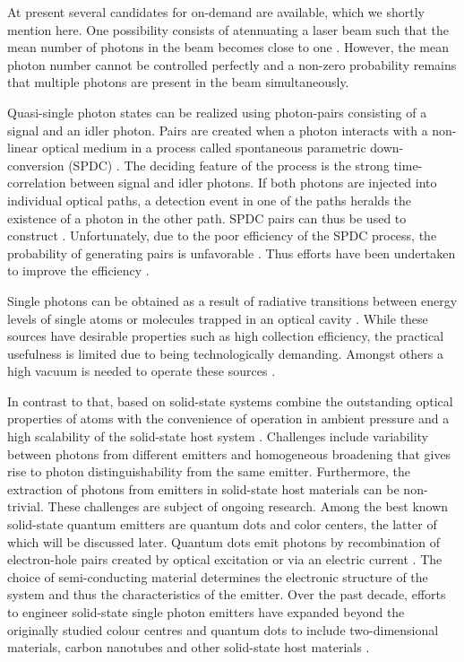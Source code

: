 	At present several candidates for on-demand \spss are available, which we shortly mention here. One possibility consists of atennuating a laser beam such that the mean number of photons in the beam becomes close to one \cite{gisin2002quantum, eisaman2011invited, migdall2013single}. However, the mean photon number cannot be controlled perfectly and a non-zero probability remains that multiple photons are present in the beam simultaneously.

	Quasi-single photon states can be realized using photon-pairs consisting of a signal and an idler photon. Pairs are created when a photon interacts with a non-linear optical medium in a process called spontaneous parametric down-conversion (SPDC) \cite{shih2003entangled, klyshko1977utilization, fasel2004high, ware2004single, brida2012extremely,SiquteProject}. The deciding feature of the process is the strong time-correlation between signal and idler photons. If both photons are injected into individual optical paths, a detection event in one of the paths heralds the existence of a photon in the other path. SPDC pairs can thus be used to construct \spss. Unfortunately, due to the poor efficiency of the SPDC process, the probability of generating pairs is unfavorable \cite{zwinkels2010photometry, Bock2016}. Thus efforts have been undertaken to improve the efficiency \cite{Bock2016, vrehavcek2003multiple, brida2008experimental}.

	Single photons can be obtained as a result of radiative transitions between energy levels of single atoms or molecules trapped in an optical cavity \cite{Kuhn2002}. While these sources have desirable properties such as high collection efficiency, the practical usefulness is limited due to being technologically demanding. Amongst others a high vacuum is needed to operate these sources \cite{zwinkels2010photometry}.

	In contrast to that, \spss based on solid-state systems combine the outstanding optical properties of atoms with the convenience of operation in ambient pressure and a high scalability of the solid-state host system \cite{loredo2016scalable,somaschi2016near,Aharonovich2016}.
	Challenges include variability between photons from different emitters and homogeneous \lw broadening that gives rise to photon distinguishability from the same emitter. 
	Furthermore, the extraction of photons from emitters in solid-state host materials can be non-trivial.
	These challenges are subject of ongoing research.
	Among the best known solid-state quantum emitters are quantum dots and color centers, the latter of which will be discussed later.
	Quantum dots emit photons by recombination of electron-hole pairs created by optical excitation or via an electric current \cite{Yuan2002, buckley2012engineered}. The choice of semi-conducting material determines the electronic structure of the system and thus the characteristics of the emitter.
	Over the past decade, efforts to engineer solid-state single photon emitters have expanded beyond the originally studied colour centres and quantum dots to include two-dimensional materials, carbon nanotubes and other solid-state host materials \cite{Aharonovich2016}.

